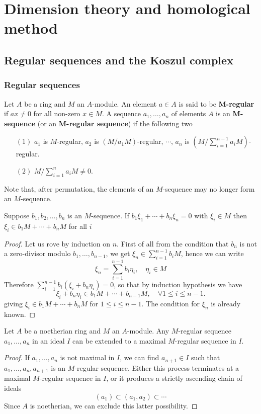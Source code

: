 \chapter{Dimension theory and homological method}
\section{Regular sequences and the Koszul complex}
\subsection{Regular sequences}
Let $A$ be a ring and $M$ an $A$-module. An element $a\in A$ is said to be \textbf{$\bm{M}$-regular} if $ax\neq0$ for all non-zero $x\in M$. A sequence $a_1,\dots,a_n$ of elements $A$ is an \textbf{$\bm{M}$-sequence} (or an \textbf{$\bm{M}$-regular sequence}) if the following two
\begin{itemize}
\item[$(1)$]$a_1$ is $M$-regular, $a_2$ is $(M/a_1M)$-regular, $\cdots$, $a_n$ is $(M/\sum_{i=1}^{n-1}a_iM)$-regular.
\item[$(2)$]$M/\sum_{i=1}^{n}a_iM\neq 0$.
\end{itemize}
Note that, after permutation, the elements of an $M$-sequence may no longer
form an $M$-sequence.
\begin{lemma}\label{regular seq lem}
Suppose $b_1,b_2,\dots,b_n$ is an $M$-sequence. If $b_1\xi_1+\cdots+b_n\xi_n=0$ with $\xi_i\in M$ then $\xi_i\in b_1M+\cdots+b_nM$ for all $i$
\end{lemma}
\begin{proof}
Let us rove by induction on $n$. First of all from the condition that $b_n$ is not a zero-divisor modulo $b_1,\dots,b_{n-1}$, we get $\xi_n\in\sum_{i=1}^{n-1}b_iM$, hence we can write
\[\xi_n=\sum_{i=1}^{n-1}b_i\eta_i,\quad \eta_i\in M\]
Therefore $\sum_{i=1}^{n-1}b_i(\xi_i+b_n\eta_i)=0$, so that by induction hypothesis we have
\[\xi_i+b_n\eta_i\in b_1M+\cdots+b_{n-1}M,\quad\forall 1\leq i\leq n-1.\]
giving $\xi_i\in b_1M+\cdots+b_nM$ for $1\leq i\leq n-1$. The condition for $\xi_n$ is already known.
\end{proof}
\begin{lemma}\label{regular seq extend}
Let $A$ be a noetherian ring and $M$ an $A$-module. Any $M$-regular sequence $a_1,\dots,a_n$ in an ideal $I$ can be extended to a maximal $M$-regular sequence in $I$.
\end{lemma}
\begin{proof}
If $a_1,\dots,a_n$ is not maximal in $I$, we can find $a_{n+1}\in I$ such that $a_1,\dots,a_n,a_{n+1}$ is an $M$-regular sequence. Either this process terminates at a maximal $M$-regular sequence in $I$, or it produces a strictly ascending chain of ideals
\[(a_1)\subset(a_1,a_2)\subset\cdots\]
Since $A$ is noetherian, we can exclude this latter possibility.
\end{proof}
